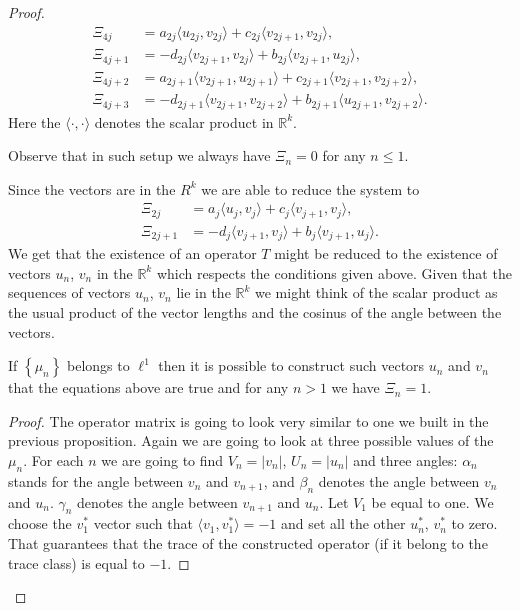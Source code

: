 \documentclass[12pt]{amsart}
\theoremstyle{case}
\begin{document}
\begin{proof}
      \begin{align*}
        \Xi_{4j} &= a_{2j} \langle u_{2j}, v_{2j}\rangle + c_{2j} \langle v_{2j+1}, v_{2j}\rangle,\\
        \Xi_{4j + 1} &= -d_{2j} \langle v_{2j+1}, v_{2j}\rangle + b_{2j} \langle v_{2j+1}, u_{2j}\rangle,\\
        \Xi_{4j + 2} &= a_{2j+1} \langle v_{2j+1}, u_{2j+1} \rangle + c_{2j+1} \langle v_{2j+1}, v_{2j+2} \rangle,\\
        \Xi_{4j + 3} &= -d_{2j+1} \langle v_{2j+1}, v_{2j+2}\rangle + b_{2j+1} \langle u_{2j+1}, v_{2j+2} \rangle.
      \end{align*}
      Here the $\langle\cdot, \cdot\rangle$ denotes the scalar product in $\mathbb{R}^k$.
      \begin{note}
        Observe that in such setup we always have $\Xi_n = 0$ for any $n \leq 1$.
      \end{note}
      Since the vectors are in the $R^k$ we are able to reduce the system to
      \begin{align*}
        \Xi_{2j} &= a_{j} \langle u_{j}, v_{j} \rangle  + c_{j} \langle v_{j+1}, v_{j} \rangle,\\
        \Xi_{2j + 1} &= -d_{j} \langle v_{j+1}, v_{j} \rangle + b_{j} \langle v_{j+1}, u_{j}\rangle.
      \end{align*}
      We get that the existence of an operator $T$ might be reduced to the existence of vectors $u_n$, $v_n$ in the $\mathbb{R}^k$
        which respects the conditions given above.
      Given that the sequences of vectors $u_n$, $v_n$ lie in the $\mathbb{R}^k$ we might think of the scalar product as
        the usual product of the vector lengths and the cosinus of the angle between the vectors.
      \begin{prop}
        \label{k-dim-statement}
        If $\left\{\mu_n\right\}$ belongs to $\ell^1$ then it is possible to construct such vectors $u_n$ and $v_n$ that the equations above are true and for any $n > 1$ we have $\Xi_n = 1$.
      \end{prop}
      \begin{proof}
        The operator matrix is going to look very similar to one we built in the previous proposition.
        Again we are going to look at three possible values of the $\mu_n$.
        For each $n$ we are going to find $V_n = |v_n|$, $U_n = |u_n|$ and three angles:
          $\alpha_n$ stands for the angle between $v_n$ and $v_{n + 1}$, and
          $\beta_n$ denotes the angle between $v_n$ and $u_n$.
          $\gamma_n$ denotes the angle between $v_{n + 1}$ and $u_n$.
        Let $V_1$ be equal to one.
        We choose the $v^*_1$ vector such that $\langle v_1, v^*_1 \rangle = -1$ and set all
        the other $u^*_n$, $v^*_n$ to zero.
        That guarantees that the trace of the constructed operator (if it belong to the trace class) is equal to $-1$.


\end{proof}
\end{proof}
\end{document}
